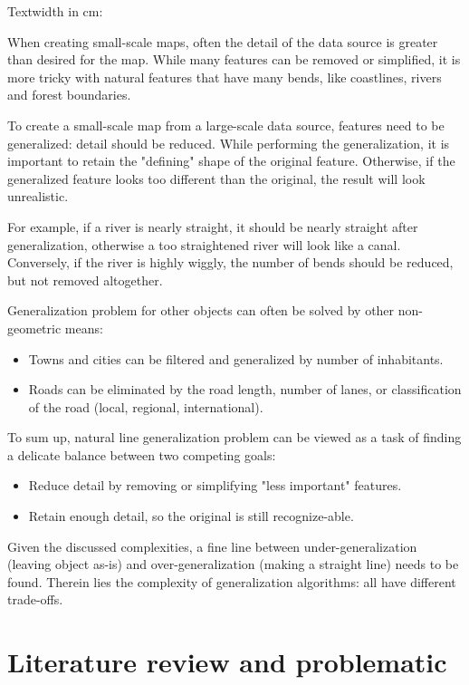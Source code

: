 \documentclass[a4paper]{article}
\begin{document}
Textwidth in cm: {\prntlen{\textwidth}}
\fi

When creating small-scale maps, often the detail of the data source is greater
than desired for the map. While many features can be removed or simplified, it
is more tricky with natural features that have many bends, like coastlines,
rivers and forest boundaries.

To create a small-scale map from a large-scale data source, features need to be
generalized: detail should be reduced. While performing the generalization, it
is important to retain the "defining" shape of the original feature. Otherwise,
if the generalized feature looks too different than the original, the result
will look unrealistic.

For example, if a river is nearly straight, it should be nearly straight after
generalization, otherwise a too straightened river will look like a canal.
Conversely, if the river is highly wiggly, the number of bends should be
reduced, but not removed altogether.

Generalization problem for other objects can often be solved by other
non-geometric means:

\begin{itemize}
    \item Towns and cities can be filtered and generalized by number of
        inhabitants.
    \item Roads can be eliminated by the road length, number of lanes, or
        classification of the road (local, regional, international).
\end{itemize}

To sum up, natural line generalization problem can be viewed as a task of
finding a delicate balance between two competing goals:

\begin{itemize}
    \item Reduce detail by removing or simplifying "less important" features.
    \item Retain enough detail, so the original is still recognize-able.
\end{itemize}

Given the discussed complexities, a fine line between under-generalization
(leaving object as-is) and over-generalization (making a straight line) needs
to be found. Therein lies the complexity of generalization algorithms: all have
different trade-offs.

\section{Literature review and problematic}
\label{sec:literature-review}
\end{document}

